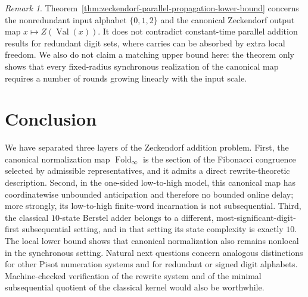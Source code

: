 \documentclass[11pt,letterpaper]{article}
\numberwithin{equation}{section}
\theoremstyle{plain}
\theoremstyle{definition}
\theoremstyle{remark}
\newtheorem{remark}[theorem]{Remark}
\DeclareMathOperator{\Val}{Val}
\DeclareMathOperator{\Fold}{Fold}
\begin{document}
\begin{remark}
Theorem~\ref{thm:zeckendorf-parallel-propagation-lower-bound} concerns the
nonredundant input alphabet $\{0,1,2\}$ and the canonical Zeckendorf output
map $x\mapsto Z(\Val(x))$.  It does not contradict constant-time parallel
addition results for redundant digit sets, where carries can be absorbed by
extra local freedom.  We also do not claim a matching upper bound here:
the theorem only shows that every fixed-radius synchronous realization of the
canonical map requires a number of rounds growing linearly with the input
scale.
\end{remark}

\section{Conclusion}

We have separated three layers of the Zeckendorf addition problem.  First, the
canonical normalization map $\Fold_\infty$ is the section of the Fibonacci
congruence selected by admissible representatives, and it admits a direct
rewrite-theoretic description.  Second, in the one-sided low-to-high model,
this canonical map has coordinatewise unbounded anticipation and therefore no
bounded online delay; more strongly, its low-to-high finite-word incarnation
is not subsequential.  Third, the classical $10$-state Berstel adder belongs
to a different, most-significant-digit-first subsequential setting, and in
that setting its state complexity is exactly $10$.  The local lower bound
shows that canonical normalization also remains nonlocal in the synchronous
setting.  Natural next questions concern analogous distinctions for other
Pisot numeration systems and for redundant or signed digit alphabets.
Machine-checked verification of the rewrite system and of the minimal
subsequential quotient of the classical kernel would also be worthwhile.



\end{document}
